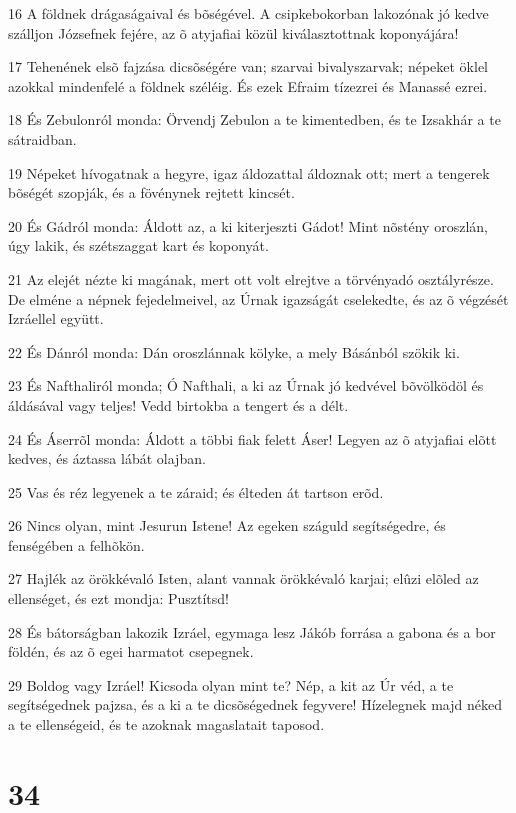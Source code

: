 \par 16 A földnek drágaságaival és bõségével. A csipkebokorban lakozónak jó kedve szálljon Józsefnek fejére, az õ atyjafiai közül kiválasztottnak koponyájára!
\par 17 Tehenének elsõ fajzása dicsõségére van; szarvai bivalyszarvak; népeket öklel azokkal mindenfelé a földnek széléig. És ezek Efraim tízezrei és Manassé ezrei.
\par 18 És Zebulonról monda: Örvendj Zebulon a te kimentedben, és te Izsakhár a te sátraidban.
\par 19 Népeket hívogatnak a hegyre, igaz áldozattal áldoznak ott; mert a tengerek bõségét szopják, és a fövénynek rejtett kincsét.
\par 20 És Gádról monda: Áldott az, a ki kiterjeszti Gádot! Mint nõstény oroszlán, úgy lakik, és szétszaggat kart és koponyát.
\par 21 Az elejét nézte ki magának, mert ott volt elrejtve a törvényadó osztályrésze. De elméne a népnek fejedelmeivel, az Úrnak igazságát cselekedte, és az õ végzését Izráellel együtt.
\par 22 És Dánról monda: Dán oroszlánnak kölyke, a mely Básánból szökik ki.
\par 23 És Nafthaliról monda; Ó Nafthali, a ki az Úrnak jó kedvével bõvölködöl és áldásával vagy teljes! Vedd birtokba a tengert és a délt.
\par 24 És Áserrõl monda: Áldott a többi fiak felett Áser! Legyen az õ atyjafiai elõtt kedves, és áztassa lábát olajban.
\par 25 Vas és réz legyenek a te záraid; és élteden át tartson erõd.
\par 26 Nincs olyan, mint Jesurun Istene! Az egeken száguld segítségedre, és fenségében a felhõkön.
\par 27 Hajlék az örökkévaló Isten, alant vannak örökkévaló karjai; elûzi elõled az ellenséget, és ezt mondja: Pusztítsd!
\par 28 És bátorságban lakozik Izráel, egymaga  lesz Jákób forrása a gabona és a bor földén, és az õ egei harmatot csepegnek.
\par 29 Boldog vagy Izráel! Kicsoda olyan mint te? Nép, a kit az Úr véd, a te segítségednek pajzsa, és a ki a te dicsõségednek fegyvere! Hízelegnek majd néked a te ellenségeid, és te azoknak magaslatait taposod.

\chapter{34}

